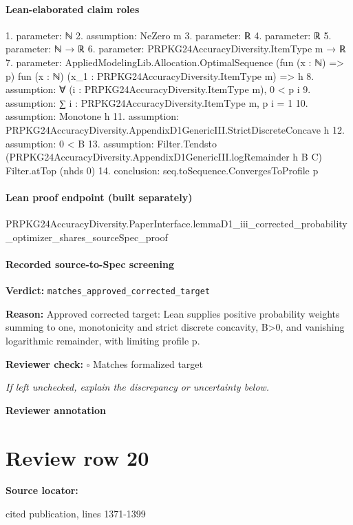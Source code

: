 \documentclass[10pt]{article}
\newcommand{\reviewerbox}{%
  \par\noindent\fbox{\parbox{0.96\linewidth}{\rule{0pt}{0.38in}}}\par
}
\newcommand{\reviewmatch}[1]{%
  \par\noindent\textbf{Reviewer check:} $\square$\; #1\par
  \noindent\emph{If left unchecked, explain the discrepancy or uncertainty below.}\par
}
\begin{document}
\paragraph{Lean-elaborated claim roles}\begin{ReviewVerbatim}
1. parameter: ℕ
2. assumption: NeZero m
3. parameter: ℝ
4. parameter: ℝ
5. parameter: ℕ → ℝ
6. parameter: PRPKG24AccuracyDiversity.ItemType m → ℝ
7. parameter: AppliedModelingLib.Allocation.OptimalSequence (fun (x : ℕ) => p)
  fun (x : ℕ) (x_1 : PRPKG24AccuracyDiversity.ItemType m) => h
8. assumption: ∀ (i : PRPKG24AccuracyDiversity.ItemType m), 0 < p i
9. assumption: ∑ i : PRPKG24AccuracyDiversity.ItemType m, p i = 1
10. assumption: Monotone h
11. assumption: PRPKG24AccuracyDiversity.AppendixD1GenericIII.StrictDiscreteConcave h
12. assumption: 0 < B
13. assumption: Filter.Tendsto (PRPKG24AccuracyDiversity.AppendixD1GenericIII.logRemainder h B C) Filter.atTop (nhds 0)
14. conclusion: seq.toSequence.ConvergesToProfile p
\end{ReviewVerbatim}

\paragraph{Lean proof endpoint (built separately)}\begin{ReviewVerbatim}
PRPKG24AccuracyDiversity.PaperInterface.lemmaD1_iii_corrected_probability_optimizer_shares_sourceSpec_proof
\end{ReviewVerbatim}

\paragraph{Recorded source-to-Spec screening}
\textbf{Verdict:} \texttt{matches\_approved\_corrected\_target}
\\
{\raggedright
\textbf{Reason:} Approved corrected target:\allowbreak{} Lean supplies positive probability weights summing to one, monotonicity and strict discrete concavity, B>0, and vanishing logarithmic remainder, with limiting profile p.\allowbreak{}
\par}
\reviewmatch{Matches formalized target}
\noindent\textbf{Reviewer annotation}\par
\reviewerbox
\clearpage
\hypertarget{source-claim-30cff96f226dc581}{}
\section*{Review row 20}
\textbf{Source locator:} {\footnotesize\raggedright cited publication, lines 1371-\allowbreak{}1399\par}
\end{document}
